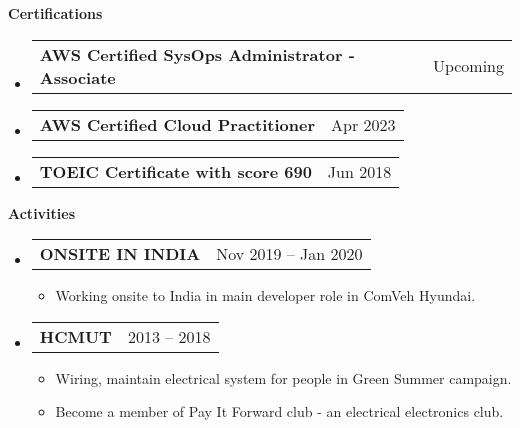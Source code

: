 \documentclass[letterpaper,12pt]{article}[leftmargin=*]
\makeatletter
\def \entryspacing {5pt}
\renewcommand{\section}[2]{\vspace{5pt}
  \colorbox{secondary}{\color{white}\raggedbottom\normalsize\textbf{{#1}{\hspace{7pt}#2}}}
}
\newcommand{\resumeEntryStart}{\begin{itemize}[leftmargin=2.5mm]}
\newcommand{\resumeEntryEnd}{\end{itemize}\vspace{\entryspacing}}
\newcommand{\resumeItemListStart}{\begin{itemize}[leftmargin=4.5mm]}
\newcommand{\resumeItemListEnd}{\end{itemize}}
\newcommand{\resumeItem}[1]{
  \item\small{
    {#1 \vspace{-2pt}}
  }
}
\newcommand{\resumeEntryTD}[2]{
  \vspace{1pt}\item[]
    \begin{tabularx}{0.97\textwidth}{X@{\hspace{60pt}}r}
      \textbf{\color{primary}#1} & {\firabook\color{accent}\small#2} \\
    \end{tabularx}\vspace{-6pt}
}
\makeatother
\begin{document}
\section{\faAward}{Certifications}
  \resumeEntryStart
    \resumeEntryTD
      {AWS Certified SysOps Administrator - Associate}{Upcoming}
  \resumeEntryEnd
  \vspace{-20pt}
  
  \resumeEntryStart
    \resumeEntryTD
      {AWS Certified Cloud Practitioner}{Apr 2023}
  \resumeEntryEnd
  \vspace{-20pt}
  
  \resumeEntryStart
    \resumeEntryTD
      {TOEIC Certificate with score 690}{Jun 2018}
  \resumeEntryEnd

\section{\faWalking}{Activities}
  \resumeEntryStart
    \resumeEntryTD
      {ONSITE IN INDIA}{Nov 2019 -- Jan 2020}
    \resumeItemListStart
      \resumeItem {Working onsite to India in main developer role in ComVeh Hyundai.}
    \resumeItemListEnd
  \resumeEntryEnd
  \vspace{-20pt}
  
  \resumeEntryStart
    \resumeEntryTD
      {HCMUT}{2013 -- 2018}
    \resumeItemListStart
      \resumeItem {Wiring, maintain electrical system for people in Green Summer campaign.}
      \resumeItem {Become a member of Pay It Forward club - an electrical electronics club.}
    \resumeItemListEnd
  \resumeEntryEnd
\end{document}
